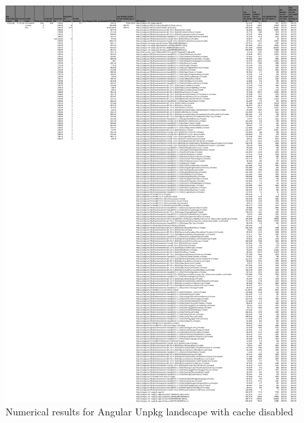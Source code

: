 \begin{figure}[!h]
	\centering
	\begin{adjustbox}{width=\textwidth,totalheight=0.9\textheight}
		\includegraphics[angle=90]{Figures/angular_unpkg_allhar.pdf}
	\end{adjustbox}
	\caption{Numerical results for Angular Unpkg landscape with cache disabled}
	\label{fig:appendix_1_6}
\end{figure}
\newpage
